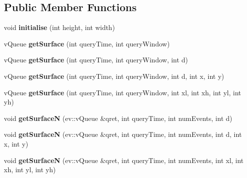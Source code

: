 \subsection*{Public Member Functions}
\begin{DoxyCompactItemize}
\item 
void {\bfseries initialise} (int height, int width)\hypertarget{classev_1_1historicalSurface_adbe662bedcf6ee9c87f9b78d15c8ae85}{}\label{classev_1_1historicalSurface_adbe662bedcf6ee9c87f9b78d15c8ae85}

\item 
v\+Queue {\bfseries get\+Surface} (int query\+Time, int query\+Window)\hypertarget{classev_1_1historicalSurface_a03476e5a9cff0d369fef76711c6ebea5}{}\label{classev_1_1historicalSurface_a03476e5a9cff0d369fef76711c6ebea5}

\item 
v\+Queue {\bfseries get\+Surface} (int query\+Time, int query\+Window, int d)\hypertarget{classev_1_1historicalSurface_a289a2d3cb116fb1cdb99d38b03d74dd0}{}\label{classev_1_1historicalSurface_a289a2d3cb116fb1cdb99d38b03d74dd0}

\item 
v\+Queue {\bfseries get\+Surface} (int query\+Time, int query\+Window, int d, int x, int y)\hypertarget{classev_1_1historicalSurface_a10f0938bac2fc0b7a0f5624dfcd65f2f}{}\label{classev_1_1historicalSurface_a10f0938bac2fc0b7a0f5624dfcd65f2f}

\item 
v\+Queue {\bfseries get\+Surface} (int query\+Time, int query\+Window, int xl, int xh, int yl, int yh)\hypertarget{classev_1_1historicalSurface_a18830cb21753a190270bf03108c95f71}{}\label{classev_1_1historicalSurface_a18830cb21753a190270bf03108c95f71}

\item 
void {\bfseries get\+SurfaceN} (ev\+::v\+Queue \&qret, int query\+Time, int num\+Events, int d)\hypertarget{classev_1_1historicalSurface_ae423da2b112194abd11e837e7142a71d}{}\label{classev_1_1historicalSurface_ae423da2b112194abd11e837e7142a71d}

\item 
void {\bfseries get\+SurfaceN} (ev\+::v\+Queue \&qret, int query\+Time, int num\+Events, int d, int x, int y)\hypertarget{classev_1_1historicalSurface_afa98f88d820fd48698a2470857440a81}{}\label{classev_1_1historicalSurface_afa98f88d820fd48698a2470857440a81}

\item 
void {\bfseries get\+SurfaceN} (ev\+::v\+Queue \&qret, int query\+Time, int num\+Events, int xl, int xh, int yl, int yh)\hypertarget{classev_1_1historicalSurface_a7d2fa665ed41226f22b90c11b3c2f00d}{}\label{classev_1_1historicalSurface_a7d2fa665ed41226f22b90c11b3c2f00d}

\end{DoxyCompactItemize}
